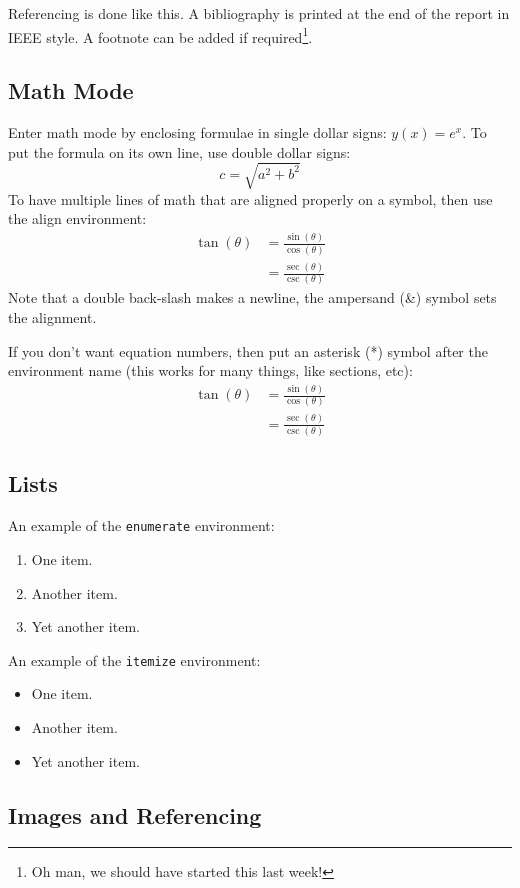 \documentclass[12pt]{article}
\begin{document}
Referencing is done like this\cite{Varghese2012}. A bibliography is printed at the end of the report in IEEE style. A footnote can be added if required\footnote{Oh man, we should have started this last week!}.

\subsection{Math Mode}

Enter math mode by enclosing formulae in single dollar signs: $y(x) = e^x$.
To put the formula on its own line, use double dollar signs: $$c = \sqrt{a^2 + b^2}$$
To have multiple lines of math that are aligned properly on a symbol, then use the align environment:
\begin{align}
	\tan(\theta) &= \frac{\sin(\theta)}{\cos(\theta)} \\
		&= \frac{\sec(\theta)}{\csc(\theta)}
\end{align}
Note that a double back-slash makes a newline, the ampersand (\&) symbol sets the alignment.

If you don't want equation numbers, then put an asterisk (*) symbol after the environment name (this works for many things, like sections, etc):
\begin{align*}
	\tan(\theta) &= \frac{\sin(\theta)}{\cos(\theta)} \\
		&= \frac{\sec(\theta)}{\csc(\theta)}
\end{align*}

\subsection{Lists}

An example of the \texttt{enumerate} environment:
\begin{enumerate}
	\item One item.
	\item Another item.
	\item Yet another item.
\end{enumerate}

An example of the \texttt{itemize} environment:
\begin{itemize}
	\item One item.
	\item Another item.
	\item Yet another item.
\end{itemize}

\subsection{Images and Referencing}
\end{document}
